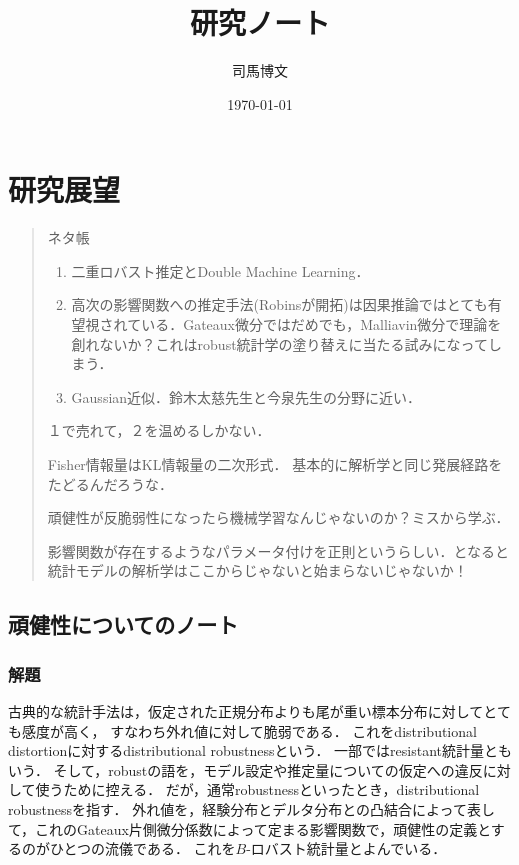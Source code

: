\documentclass[uplatex,dvipdfmx]{jsreport}
\title{研究ノート}
\author{司馬博文}
\date{\today}
\begin{document}
\tableofcontents

\chapter{研究展望}

\begin{quotation}
    ネタ帳
    \begin{enumerate}
        \item 二重ロバスト推定とDouble Machine Learning．
        \item 高次の影響関数への推定手法(Robinsが開拓)は因果推論ではとても有望視されている．Gateaux微分ではだめでも，Malliavin微分で理論を創れないか？これはrobust統計学の塗り替えに当たる試みになってしまう．
        \item Gaussian近似．鈴木太慈先生と今泉先生の分野に近い．
    \end{enumerate}
    １で売れて，２を温めるしかない．

    Fisher情報量はKL情報量の二次形式．
    基本的に解析学と同じ発展経路をたどるんだろうな．

    頑健性が反脆弱性になったら機械学習なんじゃないのか？ミスから学ぶ．

    影響関数が存在するようなパラメータ付けを正則というらしい．となると統計モデルの解析学はここからじゃないと始まらないじゃないか！
\end{quotation}

\section{頑健性についてのノート}

\subsection{解題}

\begin{usage}
    古典的な統計手法は，仮定された正規分布よりも尾が重い標本分布に対してとても感度が高く，
    すなわち外れ値に対して脆弱である．
    これをdistributional distortionに対するdistributional robustnessという．
    一部ではresistant統計量ともいう．
    そして，robustの語を，モデル設定や推定量についての仮定への違反に対して使うために控える．
    だが，通常robustnessといったとき，distributional robustnessを指す．
    外れ値を，経験分布とデルタ分布との凸結合によって表して，これのGateaux片側微分係数によって定まる影響関数で，頑健性の定義とするのがひとつの流儀である．
    これを$B$-ロバスト統計量とよんでいる．
\end{usage}
\end{document}
